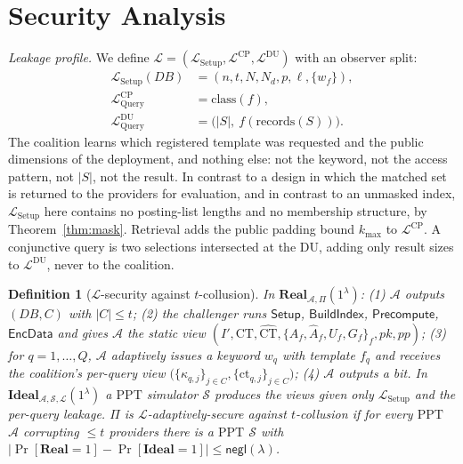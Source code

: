 \documentclass[journal]{IEEEtran}
\newtheorem{definition}{Definition}
\newcommand{\negl}{\mathsf{negl}}
\newcommand{\PPT}{\mathrm{PPT}}
\newcommand{\Real}{\mathbf{Real}}
\newcommand{\Ideal}{\mathbf{Ideal}}
\newcommand{\Leak}{\mathcal{L}}
\newcommand{\Sim}{\mathcal{S}}
\newcommand{\Adv}{\mathcal{A}}
\begin{document}
\section{Security Analysis}
\label{sec:security}

\emph{Leakage profile.} We define $\Leak=(\Leak_{\mathrm{Setup}},\Leak^{\text{CP}},\Leak^{\text{DU}})$ with an observer split:
\begin{align*}
\Leak_{\mathrm{Setup}}(DB) &= (n,t,N,N_d,p,\ell,\{w_f\}),\\
\Leak^{\text{CP}}_{\mathrm{Query}} &= \mathrm{class}(f),\\
\Leak^{\text{DU}}_{\mathrm{Query}} &= \big(|S|,\ f(\mathrm{records}(S))\big).
\end{align*}
The coalition learns which registered template was requested and the public dimensions of the deployment, and nothing else: not the keyword, not the access pattern, not $|S|$, not the result. In contrast to a design in which the matched set is returned to the providers for evaluation, and in contrast to an unmasked index, $\Leak_{\mathrm{Setup}}$ here contains no posting-list lengths and no membership structure, by Theorem~\ref{thm:mask}. Retrieval adds the public padding bound $k_{\max}$ to $\Leak^{\text{CP}}$. A conjunctive query is two selections intersected at the DU, adding only result sizes to $\Leak^{\text{DU}}$, never to the coalition.

\begin{definition}[$\Leak$-security against $t$-collusion]
\label{def:sec}
In $\Real_{\Adv,\Pi}(1^\lambda)$: (1) $\Adv$ outputs $(DB,C)$ with $|C|\le t$; (2) the challenger runs $\mathsf{Setup}$, $\mathsf{BuildIndex}$, $\mathsf{Precompute}$, $\mathsf{EncData}$ and gives $\Adv$ the static view $(I',\text{CT},\widehat{\text{CT}},\{A_f,\widehat A_f,U_f,G_f\}_f,pk,pp)$; (3) for $q=1,\dots,Q$, $\Adv$ adaptively issues a keyword $w_q$ with template $f_q$ and receives the coalition's per-query view $\big(\{\kappa_{q,j}\}_{j\in C},\{\text{ct}_{q,j}\}_{j\in C}\big)$; (4) $\Adv$ outputs a bit. In $\Ideal_{\Adv,\Sim,\Leak}(1^\lambda)$ a $\PPT$ simulator $\Sim$ produces the views given only $\Leak_{\mathrm{Setup}}$ and the per-query leakage. $\Pi$ is $\Leak$-adaptively-secure against $t$-collusion if for every $\PPT$ $\Adv$ corrupting $\le t$ providers there is a $\PPT$ $\Sim$ with $|\Pr[\Real=1]-\Pr[\Ideal=1]|\le\negl(\lambda)$.
\end{definition}
\end{document}
